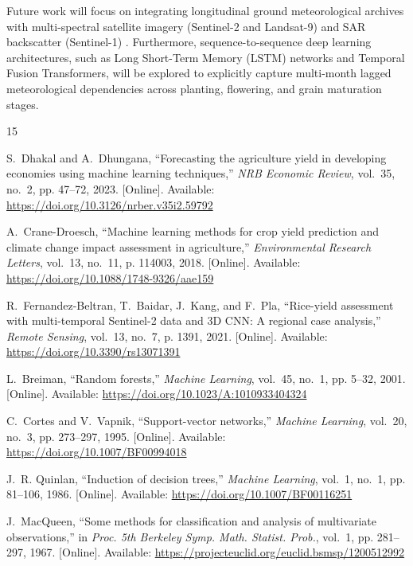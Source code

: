 \documentclass[conference]{IEEEtran}
\begin{document}
Future work will focus on integrating longitudinal ground meteorological archives with multi-spectral satellite imagery (Sentinel-2 and Landsat-9) and SAR backscatter (Sentinel-1) \cite{fernandez2021}. Furthermore, sequence-to-sequence deep learning architectures, such as Long Short-Term Memory (LSTM) networks and Temporal Fusion Transformers, will be explored to explicitly capture multi-month lagged meteorological dependencies across planting, flowering, and grain maturation stages.

\begin{thebibliography}{15}

S.~Dhakal and A.~Dhungana, ``Forecasting the agriculture yield in developing economies using machine learning techniques,'' \emph{NRB Economic Review}, vol.~35, no.~2, pp. 47--72, 2023. [Online]. Available: \url{https://doi.org/10.3126/nrber.v35i2.59792}

A.~Crane-Droesch, ``Machine learning methods for crop yield prediction and climate change impact assessment in agriculture,'' \emph{Environmental Research Letters}, vol.~13, no.~11, p. 114003, 2018. [Online]. Available: \url{https://doi.org/10.1088/1748-9326/aae159}

R.~Fernandez-Beltran, T.~Baidar, J.~Kang, and F.~Pla, ``Rice-yield assessment with multi-temporal Sentinel-2 data and 3D CNN: A regional case analysis,'' \emph{Remote Sensing}, vol.~13, no.~7, p. 1391, 2021. [Online]. Available: \url{https://doi.org/10.3390/rs13071391}

L.~Breiman, ``Random forests,'' \emph{Machine Learning}, vol.~45, no.~1, pp. 5--32, 2001. [Online]. Available: \url{https://doi.org/10.1023/A:1010933404324}

C.~Cortes and V.~Vapnik, ``Support-vector networks,'' \emph{Machine Learning}, vol.~20, no.~3, pp. 273--297, 1995. [Online]. Available: \url{https://doi.org/10.1007/BF00994018}

J.~R. Quinlan, ``Induction of decision trees,'' \emph{Machine Learning}, vol.~1, no.~1, pp. 81--106, 1986. [Online]. Available: \url{https://doi.org/10.1007/BF00116251}

J.~MacQueen, ``Some methods for classification and analysis of multivariate observations,'' in \emph{Proc. 5th Berkeley Symp. Math. Statist. Prob.}, vol.~1, pp. 281--297, 1967. [Online]. Available: \url{https://projecteuclid.org/euclid.bsmsp/1200512992}


\end{thebibliography}
\end{document}

